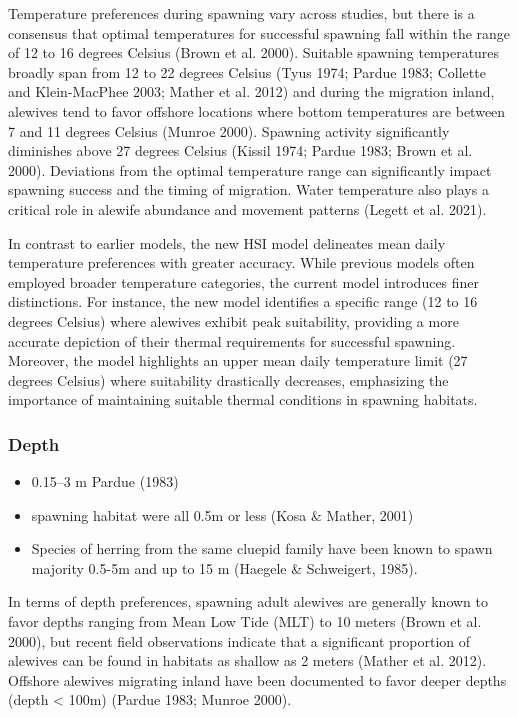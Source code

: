 \documentclass[
]{book}
\providecommand{\tightlist}{%
  \setlength{\itemsep}{0pt}\setlength{\parskip}{0pt}}
\begin{document}
Temperature preferences during spawning vary across studies, but there is a consensus that optimal temperatures for successful spawning fall within the range of 12 to 16 degrees Celsius (Brown et al. 2000).
Suitable spawning temperatures broadly span from 12 to 22 degrees Celsius (Tyus 1974; Pardue 1983; Collette and Klein-MacPhee 2003; Mather et al. 2012) and during the migration inland, alewives tend to favor offshore locations where bottom temperatures are between 7 and 11 degrees Celsius (Munroe 2000).
Spawning activity significantly diminishes above 27 degrees Celsius (Kissil 1974; Pardue 1983; Brown et al. 2000).
Deviations from the optimal temperature range can significantly impact spawning success and the timing of migration.
Water temperature also plays a critical role in alewife abundance and movement patterns (Legett et al. 2021).

In contrast to earlier models, the new HSI model delineates mean daily temperature preferences with greater accuracy.
While previous models often employed broader temperature categories, the current model introduces finer distinctions.
For instance, the new model identifies a specific range (12 to 16 degrees Celsius) where alewives exhibit peak suitability, providing a more accurate depiction of their thermal requirements for successful spawning.
Moreover, the model highlights an upper mean daily temperature limit (27 degrees Celsius) where suitability drastically decreases, emphasizing the importance of maintaining suitable thermal conditions in spawning habitats.

\hypertarget{depth-3}{%
\subsubsection{Depth}\label{depth-3}}

\begin{itemize}
\tightlist
\item
  0.15--3 m Pardue (1983)
\item
  spawning habitat were all 0.5m or less (Kosa \& Mather, 2001)
\item
  Species of herring from the same cluepid family have been known to spawn majority 0.5-5m and up to 15 m (Haegele \& Schweigert, 1985).
\end{itemize}

In terms of depth preferences, spawning adult alewives are generally known to favor depths ranging from Mean Low Tide (MLT) to 10 meters (Brown et al. 2000), but recent field observations indicate that a significant proportion of alewives can be found in habitats as shallow as 2 meters (Mather et al. 2012).
Offshore alewives migrating inland have been documented to favor deeper depths (depth \textless{} 100m) (Pardue 1983; Munroe 2000).
\end{document}
